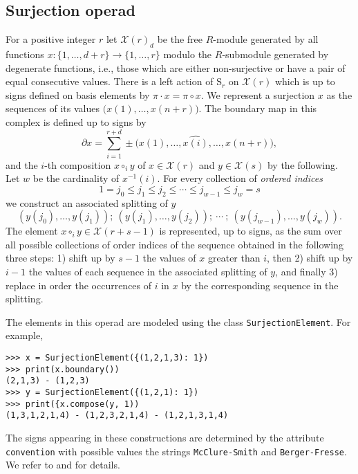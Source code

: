 \documentclass{amsart}
\newcommand{\X}{\mathcal X}
\begin{document}
\subsection{Surjection operad}

For a positive integer $r$ let $\mathcal X(r)_d$ be the free $R$-module generated by all functions $x : \{1, \dots, d+r\} \to \{1, \dots, r\}$ modulo the $R$-submodule generated by degenerate functions, i.e., those which are either non-surjective or have a pair of equal consecutive values. There is a left action of $\mathrm S_r$ on $\mathcal X(r)$ which is up to signs defined on basis elements by $\pi \cdot x = \pi \circ x$.
We represent a surjection $x$ as the sequences of its values $\big( x(1), \dots, x(n+r) \big)$. The boundary map in this complex is defined up to signs by
\begin{equation*}
\partial x = \sum_{i = 1}^{r+d} \pm \big( x(1), \dots, \widehat{x(i)}, \dots, x(n+r) \big),
\end{equation*}
and the $i$-th composition $x \circ_i y$ of $x \in \mathcal X(r)$ and $y \in \mathcal X(s)$ by the following. Let $w$ be the cardinality of $x^{-1}(i)$. For every collection of \textit{ordered indices}
\begin{equation*}
1 = j_0 \leq j_1 \leq j_2 \leq \cdots \leq j_{w-1} \leq j_w = s
\end{equation*}
we construct an associated splitting of $y$
\begin{equation*}
(y(j_0), \dots, y(j_1));\ (y(j_1), \dots, y(j_2));\ \cdots \ ;\ (y(j_{w-1}), \dots, y(j_w)).
\end{equation*}
The element $x \circ_i y \in \X(r+s-1)$ is represented, up to signs, as the sum over all possible collections of order indices of the sequence obtained in the following three steps: 1) shift up by $s-1$ the values of $x$ greater than $i$, then 2) shift up by $i-1$ the values of each sequence in the associated splitting of $y$, and finally 3) replace in order the occurrences of $i$ in $x$ by the corresponding sequence in the splitting.

The elements in this operad are modeled using the class \texttt{SurjectionElement}. For example,
\begin{verbatim}
>>> x = SurjectionElement({(1,2,1,3): 1})
>>> print(x.boundary())
(2,1,3) - (1,2,3)
>>> y = SurjectionElement({(1,2,1): 1})
>>> print({x.compose(y, 1))
(1,3,1,2,1,4) - (1,2,3,2,1,4) - (1,2,1,3,1,4)
\end{verbatim}

The signs appearing in these constructions are determined by the attribute \texttt{convention} with possible values the strings \texttt{McClure-Smith} and \texttt{Berger-Fresse}. We refer to \cite{McClureSmith03} and \cite{BergerFresse04} for details.
\end{document}
